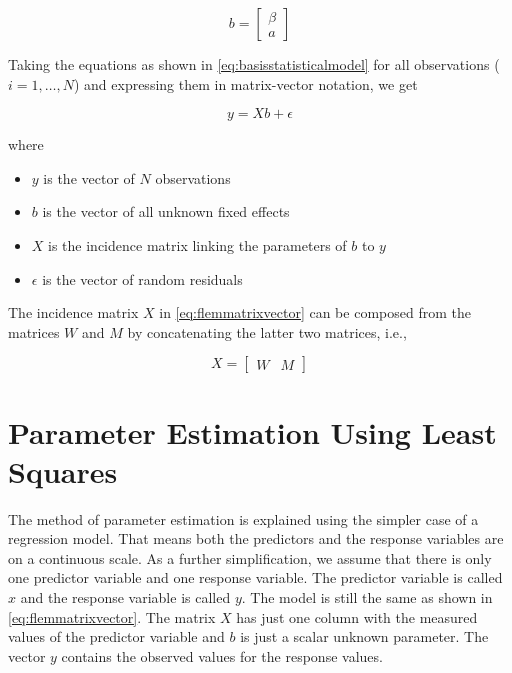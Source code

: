 \documentclass[]{book}
\providecommand{\tightlist}{%
  \setlength{\itemsep}{0pt}\setlength{\parskip}{0pt}}
\theoremstyle{definition}
\theoremstyle{definition}
\theoremstyle{definition}
\theoremstyle{remark}
\begin{document}
\begin{equation}
  b = \left[ \begin{array}{c} \beta \\ a \end{array} \right]
  \label{eq:combinefixedeffects}
\end{equation}

Taking the equations as shown in \eqref{eq:basisstatisticalmodel} for all observations (\(i=1, \ldots, N\)) and expressing them in matrix-vector notation, we get

\begin{equation}
 y = Xb + \epsilon
 \label{eq:flemmatrixvector}
\end{equation}

where

\begin{itemize}
\tightlist
\item
  \(y\) is the vector of \(N\) observations
\item
  \(b\) is the vector of all unknown fixed effects
\item
  \(X\) is the incidence matrix linking the parameters of \(b\) to \(y\)
\item
  \(\epsilon\) is the vector of random residuals
\end{itemize}

The incidence matrix \(X\) in \eqref{eq:flemmatrixvector} can be composed from the matrices \(W\) and \(M\) by concatenating the latter two matrices, i.e.,

\begin{equation}
  X = \left[ \begin{array}{cc} W  &  M  \end{array} \right]
  \label{eq:composematrixx}
\end{equation}

\hypertarget{asm-flem-parameter-estimation}{%
\section{Parameter Estimation Using Least Squares}\label{asm-flem-parameter-estimation}}

The method of parameter estimation is explained using the simpler case of a regression model. That means both the predictors and the response variables are on a continuous scale. As a further simplification, we assume that there is only one predictor variable and one response variable. The predictor variable is called \(x\) and the response variable is called \(y\). The model is still the same as shown in \eqref{eq:flemmatrixvector}. The matrix \(X\) has just one column with the measured values of the predictor variable and \(b\) is just a scalar unknown parameter. The vector \(y\) contains the observed values for the response values.
\end{document}
